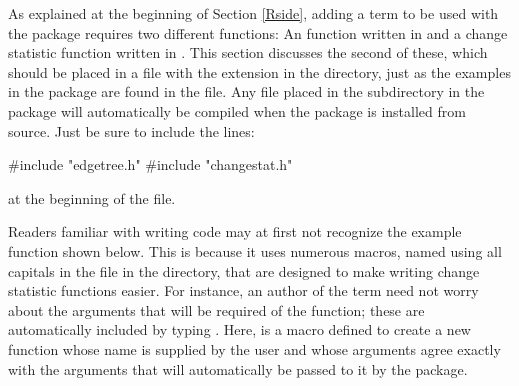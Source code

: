 \documentclass[nojss]{jss}
\begin{document}
As explained at the beginning of Section \ref{Rside}, adding a term to be
used with the  package requires two different functions:  An
 function written in  and a
change statistic function written in .  This section discusses the
second of these, which should be placed in a file with the extension 
in the  directory, just as the examples in the
 package are found in the 
file.
Any  file placed in the  subdirectory in the
 package will
automatically be compiled when the package is installed from source. Just be sure to include the lines:
\begin{CodeChunk}
\begin{CodeInput}
#include "edgetree.h"
#include "changestat.h"
\end{CodeInput}
\end{CodeChunk}
at the beginning of the file.

Readers familiar with writing  code may at first not recognize
the example  function shown below.  This is because it
uses numerous macros, named using all capitals
in the  file in the
 directory, that are designed to make writing change statistic
functions easier.
For instance, an author of the  term need not worry about
the arguments that will be required of the  function; these
are automatically included by typing
.  Here,  is a macro
defined to create a new function whose name is supplied by the user and
whose arguments agree exactly with the arguments that will automatically be passed to
it by the  package.
\end{document}
